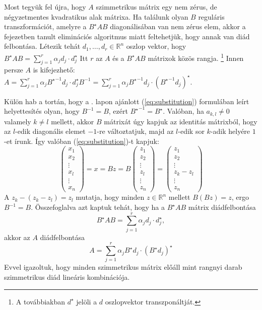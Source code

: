 \documentclass[a4paper, showtrims]{memoir}
\theoremstyle{plain}
\theoremstyle{remark}
\theoremstyle{definition}
\begin{document}
Most tegyük fel újra, hogy $A$ szimmetrikus mátrix egy nem zérus, de négyzetmentes kvadratikus alak mátrixa.
Ha találunk olyan $B$ reguláris transzformációt, amelyre a $B^\star AB$ diagonálisában van nem zérus elem,
akkor a fejezetben tanult eliminációs algoritmus miatt feltehetjük, hogy annak van diád felbontása.
Létezik tehát $d_1,\dots,d_r\in\mathbb{R}^n$ oszlop vektor, hogy 
\(
    B^\star AB=\sum_{j=1}^r\alpha_jd_j\cdot d_j^\star
\)
Itt $r$ az $A$ és a $B^\star AB$ mátrixok közös rangja.%
\footnote{A továbbiakban $d^\star$ jelöli a $d$ oszlopvektor transzponáltját.}
Innen persze $A$ is kifejezhető:
\(
    A=\sum_{j=1}^r\alpha_j{B^\star}^{-1}d_j\cdot d_j^\star B^{-1}
    =
    \sum_{j=1}^r\alpha_j{B^\star}^{-1}d_j\cdot \left( {B^\star}^{-1}d_j \right)^\star.
\)


Külön hab a tortán, 
hogy a \pageref{eq:substitution}. lapon ajánlott (\ref{eq:substitution}) formulában leírt helyettesítés olyan, 
hogy $B^{-1}=B$, ezért ${B^\star}^{-1}=B^\star$.
Valóban, ha $a_{k,l}\neq 0$ valamely $k\neq l$ mellett,
akkor $B$ mátrixát úgy kapjuk az identitás mátrixból, hogy az $l$-edik diagonális elemet $-1$-re változtatjuk,
majd az $l$-edik sor $k$-adik helyére $1$-et írunk.
Így valóban (\ref{eq:substitution})-t kapjuk:
\[
    \begin{pmatrix}
        x_1\\x_2\\\vdots\\ x_l\\\vdots\\x_n
    \end{pmatrix}
    =
    x=Bz
    =B
    \begin{pmatrix}
        z_1\\z_2\\\vdots\\ z_l\\\vdots\\z_n
    \end{pmatrix}
    =
    \begin{pmatrix}
        z_1\\z_2\\\vdots\\ z_k-z_l\\\vdots\\z_n
    \end{pmatrix}
\]
A $z_k-\left( z_k-z_l \right)=z_l$ mutatja, hogy minden $z\in\mathbb{R}^n$ mellett $B(Bz)=z$, 
ergo $B^{-1}=B$.
Összefoglalva azt kaptuk tehát, hogy ha a $B^\star AB$ mátrix diádfelbontása
\[
    B^\star AB
    =
    \sum_{j=1}^r\alpha_jd_j\cdot d_j^\star,
\]
akkor az $A$ diádfelbontása
\[
    A=
    \sum_{j=1}^r\alpha_jB^{\star}d_j\cdot\left( B^\star d_j \right)^\star
\]
Evvel igazoltuk, hogy minden szimmetrikus mátrix előáll mint rangnyi darab szimmetrikus diád lineáris kombinációja.
\end{document}

